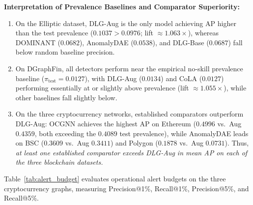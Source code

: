 \documentclass[11pt,a4paper]{article}
\begin{document}
\textbf{Interpretation of Prevalence Baselines and Comparator Superiority:}
\begin{enumerate}
    \item On the Elliptic dataset, DLG-Aug is the only model achieving AP higher than the test prevalence ($0.1037 > 0.0976$; lift $\approx 1.063\times$), whereas DOMINANT ($0.0682$), AnomalyDAE ($0.0538$), and DLG-Base ($0.0687$) fall below random baseline precision.
    \item On DGraphFin, all detectors perform near the empirical no-skill prevalence baseline ($\pi_{\mathrm{test}} = 0.0127$), with DLG-Aug ($0.0134$) and CoLA ($0.0127$) performing essentially at or slightly above prevalence (lift $\approx 1.055\times$), while other baselines fall slightly below.
    \item On the three cryptocurrency networks, established comparators outperform DLG-Aug: OCGNN achieves the highest AP on Ethereum ($0.4996$ vs.\ Aug $0.4359$, both exceeding the $0.4089$ test prevalence), while AnomalyDAE leads on BSC ($0.3609$ vs.\ Aug $0.3411$) and Polygon ($0.1878$ vs.\ Aug $0.0731$). Thus, \textit{at least one established comparator exceeds DLG-Aug in mean AP on each of the three blockchain datasets.}
\end{enumerate}

Table~\ref{tab:alert_budget} evaluates operational alert budgets on the three cryptocurrency graphs, measuring Precision@1\%, Recall@1\%, Precision@5\%, and Recall@5\%.
\end{document}
